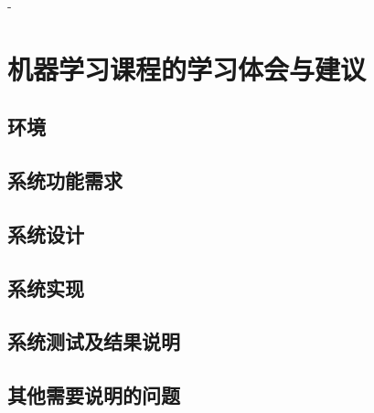 -
\section{机器学习课程的学习体会与建议}
\subsection{环境}


\subsection{系统功能需求}


\subsection{系统设计}


\subsection{系统实现}


\subsection{系统测试及结果说明}


\subsection{其他需要说明的问题}